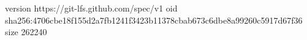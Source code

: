 version https://git-lfs.github.com/spec/v1
oid sha256:4706cbe18f155d2a7fb1241f3423b11378cbab673c6dbe8a99260c5917d67f36
size 262240
